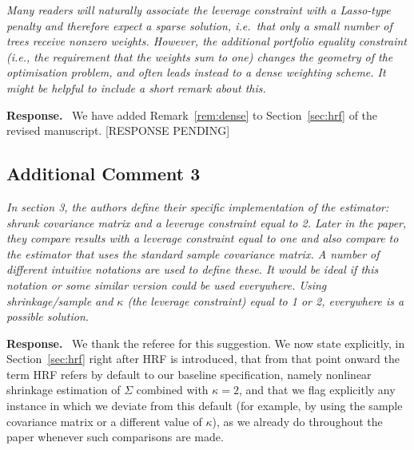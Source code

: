 \documentclass[12pt]{article}
\newcommand{\comment}[1]{\begin{refbox}\textit{#1}\end{refbox}}
\newcommand{\response}{\medskip\noindent\textbf{Response.}\ }
\begin{document}
\comment{Many readers will naturally associate the leverage constraint with a
Lasso-type penalty and therefore expect a sparse solution, i.e.\ that only a
small number of trees receive nonzero weights.  However, the additional
portfolio equality constraint (i.e., the requirement that the weights sum to
one) changes the geometry of the optimisation problem, and often leads instead
to a dense weighting scheme.  It might be helpful to include a short remark
about this.}

\response
We have added Remark~\ref*{rem:dense} to Section~\ref*{sec:hrf} of the
revised manuscript.
[RESPONSE PENDING]


\subsection*{Additional Comment 3}

\comment{In section 3, the authors define their specific implementation of the
estimator: shrunk covariance matrix and a leverage constraint equal to 2.
Later in the paper, they compare results with a leverage constraint equal to
one and also compare to the estimator that uses the standard sample covariance
matrix.  A number of different intuitive notations are used to define these.
It would be ideal if this notation or some similar version could be used
everywhere.  Using shrinkage/sample and $\kappa$ (the leverage constraint)
equal to 1 or 2, everywhere is a possible solution.}

\response
We thank the referee for this suggestion.
We now state explicitly, in Section~\ref*{sec:hrf} right after HRF is
introduced, that from that point onward the term HRF refers by default to
our baseline specification, namely nonlinear shrinkage estimation of
$\Sigma$ combined with $\kappa = 2$, and that we flag explicitly any
instance in which we deviate from this default (for example, by using the
sample covariance matrix or a different value of $\kappa$), as we already
do throughout the paper whenever such comparisons are made.



\end{document}

